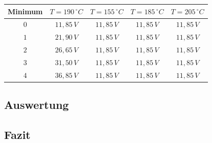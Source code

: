 \begin{center}
\begin{tabular}{c|c|c|c|c}
Minimum & \(T=190\,^\circ C\) & \(T=155\,^\circ C\) & \( T=185\,^\circ C\) & \(T=205\,^\circ C\)\\\hline
\(0\) & \(11,85\, V\) & \(11,85\, V\) & \(11,85\, V\) & \(11,85\, V\)\\
\(1\) & \(21,90\, V\) & \(11,85\, V\) & \(11,85\, V\) & \(11,85\, V\)\\
\(2\) & \(26,65\, V\) & \(11,85\, V\) & \(11,85\, V\) & \(11,85\, V\)\\
\(3\) & \(31,50\, V\) & \(11,85\, V\) & \(11,85\, V\) & \(11,85\, V\)\\
\(4\) & \(36,85\, V\) & \(11,85\, V\) & \(11,85\, V\) & \(11,85\, V\)\\
\end{tabular}
\end{center} 
\subsection{Auswertung}
\subsection{Fazit}